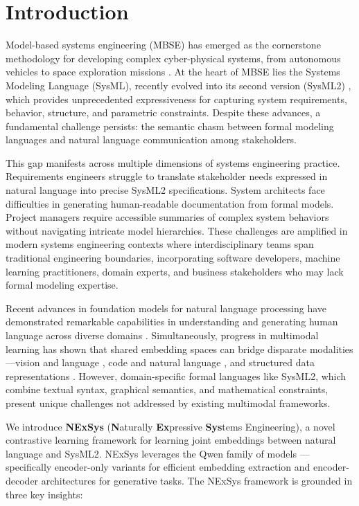 \documentclass{article}
\begin{document}
\section{Introduction}
\label{sec:intro}

Model-based systems engineering (MBSE) has emerged as the cornerstone methodology for developing complex cyber-physical systems, from autonomous vehicles to space exploration missions \cite{estefan2008survey, friedenthal2014practical}. At the heart of MBSE lies the Systems Modeling Language (SysML), recently evolved into its second version (SysML2) \cite{sysml2spec}, which provides unprecedented expressiveness for capturing system requirements, behavior, structure, and parametric constraints. Despite these advances, a fundamental challenge persists: the semantic chasm between formal modeling languages and natural language communication among stakeholders.

This gap manifests across multiple dimensions of systems engineering practice. Requirements engineers struggle to translate stakeholder needs expressed in natural language into precise SysML2 specifications. System architects face difficulties in generating human-readable documentation from formal models. Project managers require accessible summaries of complex system behaviors without navigating intricate model hierarchies. These challenges are amplified in modern systems engineering contexts where interdisciplinary teams span traditional engineering boundaries, incorporating software developers, machine learning practitioners, domain experts, and business stakeholders who may lack formal modeling expertise.

Recent advances in foundation models for natural language processing have demonstrated remarkable capabilities in understanding and generating human language across diverse domains \cite{brown2020language, chowdhery2022palm, touvron2023llama}. Simultaneously, progress in multimodal learning has shown that shared embedding spaces can bridge disparate modalities—vision and language \cite{radford2021learning}, code and natural language \cite{chen2021evaluating, li2023starcoder}, and structured data representations \cite{yin2018tranx}. However, domain-specific formal languages like SysML2, which combine textual syntax, graphical semantics, and mathematical constraints, present unique challenges not addressed by existing multimodal frameworks.

We introduce \textbf{NExSys} (\textbf{N}aturally \textbf{Ex}pressive \textbf{Sys}tems Engineering), a novel contrastive learning framework for learning joint embeddings between natural language and SysML2. NExSys leverages the Qwen family of models \cite{bai2023qwen}—specifically encoder-only variants for efficient embedding extraction and encoder-decoder architectures for generative tasks. The NExSys framework is grounded in three key insights:
\end{document}
